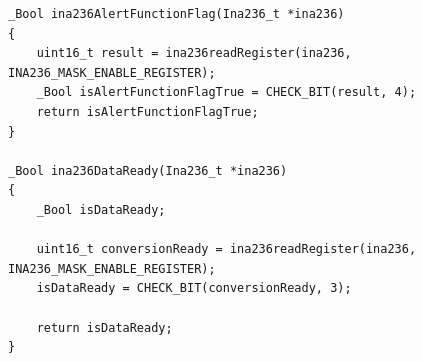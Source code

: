 \documentclass[
10pt, %
a4paper, %
oneside, %
headinclude,footinclude, %
BCOR5mm, %
]{scrartcl}
\begin{document}
\begin{lstlisting}[firstnumber=1,style=CStyle]
_Bool ina236AlertFunctionFlag(Ina236_t *ina236)
{
	uint16_t result = ina236readRegister(ina236, INA236_MASK_ENABLE_REGISTER);
	_Bool isAlertFunctionFlagTrue = CHECK_BIT(result, 4);
	return isAlertFunctionFlagTrue;
}

_Bool ina236DataReady(Ina236_t *ina236)
{
	_Bool isDataReady;
	
	uint16_t conversionReady = ina236readRegister(ina236, INA236_MASK_ENABLE_REGISTER);
	isDataReady = CHECK_BIT(conversionReady, 3);
	
	return isDataReady;
}

\end{lstlisting}




%


\end{document}
